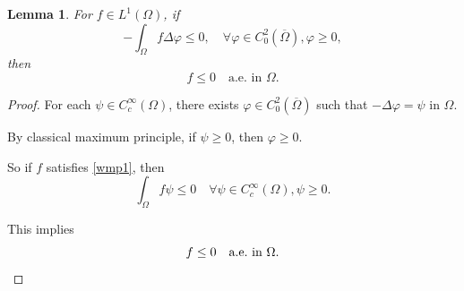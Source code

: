 \documentclass[a4paper, 11pt]{report}
\newtheorem{lmm}{Lemma}[chapter]
\theoremstyle{definition}\newtheorem*{rmk}{Remark}
\begin{document}
\begin{lmm}\label{L1e1lmm}
For $f \in L^1(\Omega)$, if
\begin{equation}\label{wmp1}
-\int_{\Omega} f\Delta\varphi \le 0, \quad \forall \varphi \in C_0^2(\overline{\Omega}), \varphi \ge 0,
\end{equation}
then
\[
f \le 0 \quad \text{a.e.\ in }\Omega .
\]
\end{lmm}
\begin{proof}
\mbox{}

For each $\psi \in C_c^{\infty}(\Omega)$, there exists $\varphi \in C^2_0(\overline{\Omega})$ such that $-\Delta \varphi = \psi$ in $\Omega$.

By classical maximum principle, if $\psi \ge 0$, then $\varphi \ge 0$. 

So if $f$ satisfies \eqref{wmp1}, then
\[
\int_{\Omega} f\psi \le 0 \quad \forall \psi \in C_c^{\infty}(\Omega), \psi \ge 0.
\]

This implies
\[
f \le 0 \quad \text{a.e.\ in } \Omega. \qedhere
\]
\end{proof}
\end{document}

